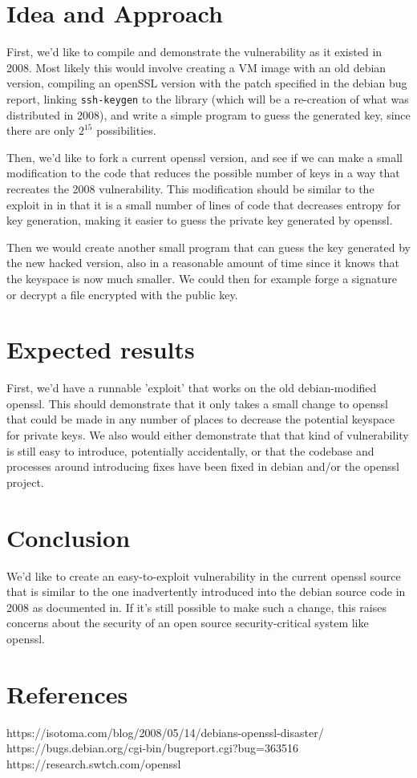 \documentclass[conference]{IEEEtran}
\begin{document}
\section{Idea and Approach}

First, we'd like to compile and demonstrate the vulnerability as it
existed in 2008. Most likely this would involve creating a VM image
with an old debian version, compiling an openSSL version with the
patch specified in the debian bug report\cite{3}, linking
\verb|ssh-keygen| to the library (which will be a re-creation of what
was distributed in 2008), and write a simple program to guess the
generated key, since there are only $2^{15}$ possibilities.

Then, we'd like to fork a current openssl version, and see if we can
make a small modification to the code that reduces the possible number
of keys in a way that recreates the 2008 vulnerability. This
modification should be similar to the exploit in \cite{1} in that it
is a small number of lines of code that decreases entropy for key
generation, making it easier to guess the private key generated by
openssl.

Then we would create another small program that can guess the key
generated by the new hacked version, also in a reasonable amount of
time since it knows that the keyspace is now much smaller. We could
then for example forge a signature or decrypt a file encrypted with
the public key.


\section{Expected results}

First, we'd have a runnable 'exploit' that works on the old
debian-modified openssl. This should demonstrate that it only takes a
small change to openssl that could be made in any number of places to
decrease the potential keyspace for private keys. We also would either
demonstrate that that kind of vulnerability is still easy to
introduce, potentially accidentally, or that the codebase and
processes around introducing fixes have been fixed in debian and/or
the openssl project.

\section{Conclusion}
We'd like to create an easy-to-exploit vulnerability in the current
openssl source that is similar to the one inadvertently introduced
into the debian source code in 2008 as documented in\cite{1}. If it's still possible to
make such a change, this raises concerns about the security of an open
source security-critical system like openssl.

\section*{References}
\begin{thebibliography}{00}

 https://isotoma.com/blog/2008/05/14/debians-openssl-disaster/
 https://bugs.debian.org/cgi-bin/bugreport.cgi?bug=363516
 https://research.swtch.com/openssl  
\end{thebibliography}
\end{document}

